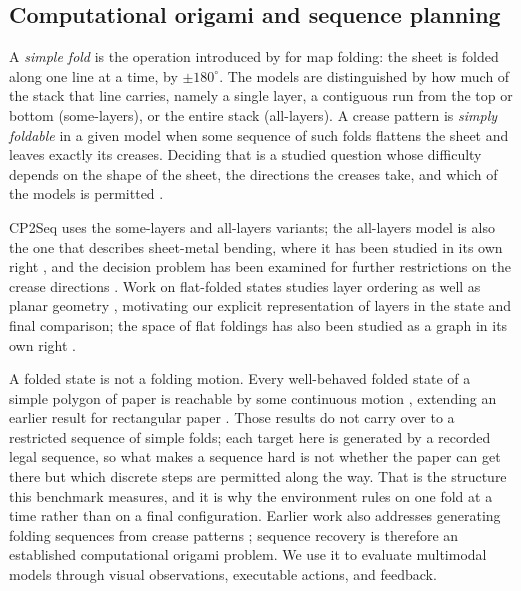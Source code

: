 \subsection{Computational origami and sequence planning}
\label{sec:related-theory}

A \emph{simple fold} is the operation introduced by \citet{arkin-map} for map folding: the sheet is
folded along one line at a time, by $\pm 180^\circ$. The models are distinguished by how much of the
stack that line carries, namely a single layer, a contiguous run from the top or bottom
(some-layers), or the entire stack (all-layers). A crease pattern is \emph{simply foldable} in a
given model when some sequence of such folds flattens the sheet and leaves exactly its creases.
Deciding that is a studied question whose difficulty depends on the shape of the sheet, the
directions the creases take, and which of the models is permitted
\citep{arkin-map,akitaya-hard}.

CP2Seq uses the some-layers and all-layers variants; the all-layers model is also the one that
describes sheet-metal bending, where it has been studied in its own right
\citep{akitaya-infinite}, and the decision problem has been examined for further restrictions on
the crease directions \citep{mixed-orthogonal}. Work on flat-folded states studies layer ordering
as well as planar geometry \citep{bern-hayes,akitaya-flatfolder,layer-algebra}, motivating our
explicit representation of layers in the state and final comparison; the space of flat foldings
has also been studied as a graph in its own right \citep{flat-folding-graphs}.

A folded state is not a folding motion. Every well-behaved folded state of a simple polygon of
paper is reachable by some continuous motion \citep{continuous}, extending an earlier result for
rectangular paper \citep{reaching-folded}. Those results do not carry over to a restricted
sequence of simple folds; each target here is generated by a recorded legal sequence, so what
makes a sequence hard is not whether the paper can get there but which discrete steps are
permitted along the way. That is the
structure this benchmark measures, and it is why the environment rules on one fold at a time
rather than on a final configuration. Earlier work also addresses generating folding sequences from crease
patterns \citep{akitaya-cp2seq}; sequence recovery is therefore an established computational
origami problem. We use it to evaluate multimodal models through visual observations, executable
actions, and feedback.
